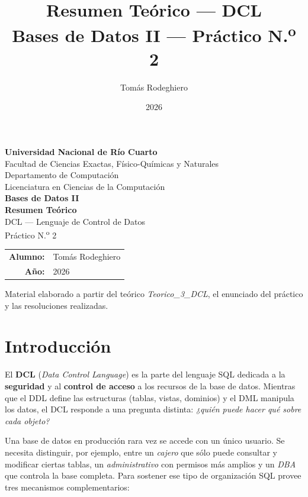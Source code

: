 \documentclass[11pt,a4paper]{article}
\title{Resumen Teórico --- DCL\\[4pt]
       \large Bases de Datos II --- Práctico N.\textsuperscript{o} 2}
\author{Tomás Rodeghiero}
\date{2026}
\begin{document}
\begin{titlepage}
    \centering
    \vspace*{1.5cm}

    {\large \textbf{Universidad Nacional de Río Cuarto}}\\[6pt]
    {\normalsize Facultad de Ciencias Exactas, Físico-Químicas y Naturales}\\[4pt]
    {\normalsize Departamento de Computación}\\[4pt]
    {\normalsize Licenciatura en Ciencias de la Computación}\\[3cm]

    {\Large \textbf{Bases de Datos II}}\\[1.2cm]

    {\Large \textbf{Resumen Teórico}}\\[6pt]
    {\large DCL --- Lenguaje de Control de Datos\\[2pt]
    Práctico N.\textsuperscript{o} 2}\\[3cm]

    \begin{tabular}{rl}
        \textbf{Alumno:} & Tomás Rodeghiero \\[4pt]
        \textbf{Año:}    & 2026 \\
    \end{tabular}

    \vfill
    {\small Material elaborado a partir del teórico
    \emph{Teorico\_3\_DCL}, el enunciado del práctico y las
    resoluciones realizadas.}
\end{titlepage}

\tableofcontents
\newpage

\section{Introducción}

El \textbf{DCL} (\emph{Data Control Language}) es la parte del lenguaje SQL
dedicada a la \textbf{seguridad} y al \textbf{control de acceso} a los
recursos de la base de datos. Mientras que el DDL define las estructuras
(tablas, vistas, dominios) y el DML manipula los datos, el DCL responde a
una pregunta distinta: \emph{¿quién puede hacer qué sobre cada objeto?}

Una base de datos en producción rara vez se accede con un único usuario.
Se necesita distinguir, por ejemplo, entre un \emph{cajero} que sólo puede
consultar y modificar ciertas tablas, un \emph{administrativo} con
permisos más amplios y un \emph{DBA} que controla la base completa.
Para sostener ese tipo de organización SQL provee tres mecanismos
complementarios:
\end{document}
